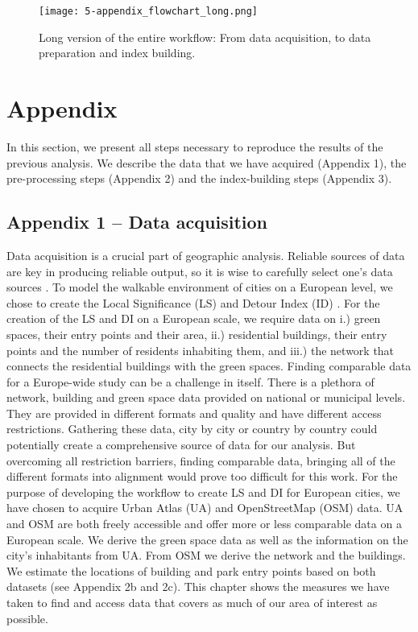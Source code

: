 \documentclass[10pt]{article}
\begin{document}
\newpage


\begin{figure}[ht!]
\centering
\texttt{[image: 5-appendix\_flowchart\_long.png]}
\caption{Long version of the entire workflow: From data acquisition, to data preparation and index building.}
\label{fig:fc}
\end{figure}

\section{Appendix}
In this section, we present all steps necessary to reproduce the results of the previous analysis.
We describe the data that we have acquired (Appendix 1), the pre-processing steps (Appendix 2) and the index-building steps (Appendix 3).

\subsection{Appendix 1 – Data acquisition}
Data acquisition is a crucial part of geographic analysis. Reliable sources of data are key in producing reliable output, so it is wise to carefully select one’s data sources \citep{vanderMeer.2019}. To model the walkable environment of cities on a European level, we chose to create the Local Significance (LS) and Detour Index (ID) \citep{Esch.2014, Wolff.2021}. For the creation of the LS and DI on a European scale, we require data on i.) green spaces, their entry points and their area, ii.) residential buildings, their entry points and the number of residents inhabiting them, and iii.) the network that connects the residential buildings with the green spaces. Finding comparable data for a Europe-wide study can be a challenge in itself. There is a plethora of network, building and green space data provided on national or municipal levels. They are provided in different formats and quality and have different access restrictions. Gathering these data, city by city or country by country could potentially create a comprehensive source of data for our analysis. But overcoming all restriction barriers, finding comparable data, bringing all of the different formats into alignment would prove too difficult for this work. For the purpose of developing the workflow to create LS and DI for European cities, we have chosen to acquire Urban Atlas (UA) and OpenStreetMap (OSM) data. UA and OSM are both freely accessible and offer more or less comparable data on a European scale. We derive the green space data as well as the information on the city’s inhabitants from UA. From OSM we derive the network and the buildings. We estimate the locations of building and park entry points based on both datasets (see Appendix 2b and 2c). This chapter shows the measures we have taken to find and access data that covers as much of our area of interest as possible.
\end{document}
